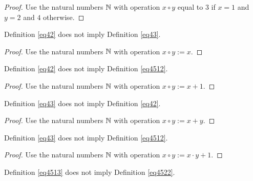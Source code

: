 \begin{proof}\leanok Use the natural numbers $\mathbb{N}$ with operation $x \circ y$ equal to $3$ if $x=1$ and $y=2$ and $4$ otherwise.
\end{proof}

\begin{theorem}\label{42_not_imply_43}\leanok{} Definition \ref{eq42} does not imply Definition \ref{eq43}.
\end{theorem}

\begin{proof}\leanok Use the natural numbers $\mathbb{N}$ with operation $x \circ y := x$.
\end{proof}

\begin{theorem}\label{42_not_imply_4512}\leanok{} Definition \ref{eq42} does not imply Definition \ref{eq4512}.
\end{theorem}

\begin{proof}\leanok Use the natural numbers $\mathbb{N}$ with operation $x \circ y := x+1$.
\end{proof}

\begin{theorem}\label{43_not_imply_42}\leanok{} Definition \ref{eq43} does not imply Definition \ref{eq42}.
\end{theorem}

\begin{proof}\leanok Use the natural numbers $\mathbb{N}$ with operation $x \circ y := x+y$.
\end{proof}

\begin{theorem}\label{43_not_imply_4512}\leanok{} Definition \ref{eq43} does not imply Definition \ref{eq4512}.
\end{theorem}

\begin{proof}\leanok Use the natural numbers $\mathbb{N}$ with operation $x \circ y := x \cdot y + 1$.
\end{proof}

\begin{theorem}\label{4513_not_imply_4522}\leanok{} Definition \ref{eq4513} does not imply Definition \ref{eq4522}.
\end{theorem}

